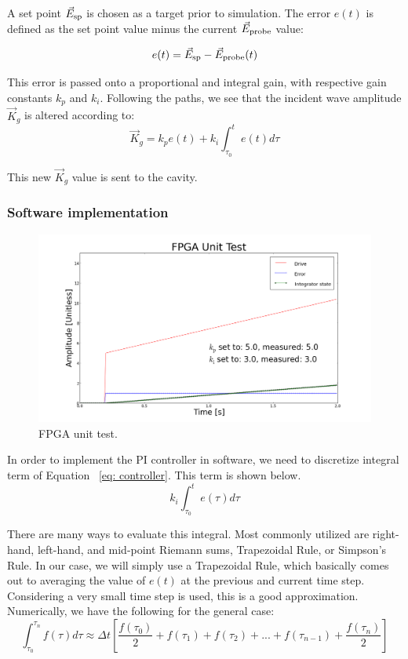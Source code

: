 \documentclass[a4paper,12pt]{article}
\newcommand{\be}{\begin{equation}}
\newcommand{\ee}{\end{equation}}
\begin{document}
A set point $\vec{E}_{\rm sp}$ is chosen as a target prior to simulation. The error $e(t)$ is defined as the set point value minus the current $\vec{E}_{\rm probe}$ value:

\be
e(t) = \vec{E}_{\rm sp} - \vec{E}_{\rm probe}(t)
\ee

\noindent This error is passed onto a proportional and integral gain, with respective gain constants $k_{p}$ and $k_{i}$. Following the paths, we see that the incident wave amplitude $\vec{K}_{g}$ is altered according to: 
\be \label{eq: controller}
\vec{K}_{g} = k_{p} e(t) + k_{i} \int_{\tau_{0}}^{t} e(t) d\tau
\ee

\noindent This new $\vec{K}_{g}$ value is sent to the cavity.

\subsubsection{Software implementation}

\begin{figure}
\centering
\includegraphics[scale=0.35]{../figures/fpga_unit_test.png}
\caption{FPGA unit test.}
\label{fig:fpga_unit_test}
\end{figure}

In order to implement the PI controller in software, we need to discretize integral term of Equation ~\ref{eq: controller}. This term is shown below. 
\be
k_{i} \int_{\tau_{0}}^{t} e(\tau)d\tau
\ee

There are many ways to evaluate this integral. Most commonly utilized are right-hand, left-hand, and mid-point Riemann sums, Trapezoidal Rule, or Simpson's Rule. In our case, we will simply use a Trapezoidal Rule, which basically comes out to averaging the value of $e(t)$ at the previous and current time step. Considering a very small time step is used, this is a good approximation. Numerically, we have the following for the general case:
\be
\int_{\tau_{0}}^{\tau_{n}} f(\tau) d\tau \approx \Delta t
		    \left[\frac{f(\tau_{0})}{2} + f(\tau_{1}) + f(\tau_{2}) + ...
		      + f(\tau_{n-1}) + \frac{f(\tau_{n})}{2}\right]
\ee
\end{document}
